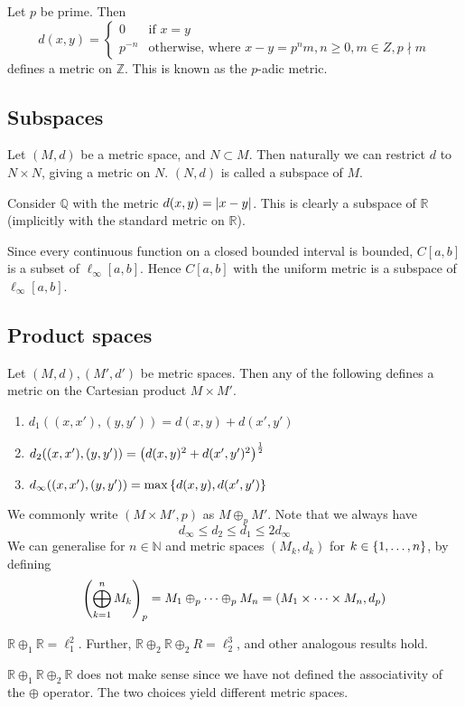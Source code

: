 \begin{example}
	Let \( p \) be prime.
	Then
	\[
		d(x,y) = \begin{cases}
			0      & \text{if } x = y                                                     \\
			p^{-n} & \text{otherwise, where } x - y = p^n m, n \geq 0, m \in Z, p \nmid m
		\end{cases}
	\]
	defines a metric on \( \mathbb Z \).
	This is known as the \( p \)-adic metric.
\end{example}

\subsection{Subspaces}
Let \( (M, d) \) be a metric space, and \( N \subset M \).
Then naturally we can restrict \( d \) to \( N \times N \), giving a metric on \( N \).
\( (N, d) \) is called a subspace of \( M \).
\begin{example}
	Consider \( \mathbb Q \) with the metric \( d(x,y) = \abs{x-y} \).
	This is clearly a subspace of \( \mathbb R \) (implicitly with the standard metric on \( \mathbb R \)).
\end{example}
\begin{example}
	Since every continuous function on a closed bounded interval is bounded, \( C[a,b] \) is a subset of \( \ell_\infty[a,b] \).
	Hence \( C[a,b] \) with the uniform metric is a subspace of \( \ell_\infty[a,b] \).
\end{example}

\subsection{Product spaces}
Let \( (M, d), (M', d') \) be metric spaces.
Then any of the following defines a metric on the Cartesian product \( M \times M' \).
\begin{enumerate}
	\item \( d_1 ((x,x'), (y,y')) = d(x,y) + d(x',y') \)
	\item \( d_2 ((x,x'), (y,y')) = \qty(d(x,y)^2 + d(x',y')^2)^{\frac{1}{2}} \)
	\item \( d_\infty ((x,x'), (y,y')) = \max\qty{ d(x,y), d(x',y') } \)
\end{enumerate}
We commonly write \( (M \times M', p) \) as \( M \oplus_p M' \).
Note that we always have
\[
	d_\infty \leq d_2 \leq d_1 \leq 2 d_\infty
\]
We can generalise for \( n \in \mathbb N \) and metric spaces \( (M_k, d_k) \) for \( k \in \qty{1,\dots,n} \), by defining
\[
	\qty( \bigoplus_{k=1}^n M_k )_p = M_1 \oplus_p \dots \oplus_p M_n = \qty( M_1 \times \dots \times M_n, d_p )
\]
\begin{example}
	\( \mathbb R \oplus_1 \mathbb R = \ell_1^2 \).
	Further, \( \mathbb R \oplus_2 \mathbb R \oplus_2 R = \ell_2^3 \), and other analogous results hold.
\end{example}
\begin{remark}
	\( \mathbb R \oplus_1 \mathbb R \oplus_2 \mathbb R \) does not make sense since we have not defined the associativity of the \( \oplus \) operator.
	The two choices yield different metric spaces.
\end{remark}

